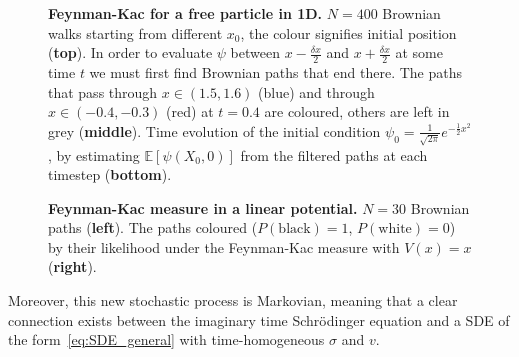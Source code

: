 \begin{figure}[H]
	\caption[Feynman-Kac for a free particle in 1D]{\textbf{Feynman-Kac for a free particle  in 1D.} $N=400$ Brownian walks starting from different $x_0$, the colour signifies initial position (\textbf{top}). In order to evaluate $\psi$ between $x-\frac{\delta x}{2}$ and $x+\frac{\delta x}{2}$ at some time $t$ we must first find Brownian paths that end there. The paths that pass through $x \in (1.5, 1.6)$ (blue) and through $x \in (-0.4,-0.3)$ (red) at $t=0.4$ are coloured, others are left in grey (\textbf{middle}). Time evolution of the initial condition $\psi_{0} = \frac{1}{\sqrt{2 \pi}} e^{-\frac{1}{2} x^{2}}$, by estimating ${\mathbb{E}}\left[\psi\left(X_{0}, 0\right)\right]$ from the filtered paths at each timestep (\textbf{bottom}).}
	\label{fig:fk_1d_example}
\end{figure}
\begin{figure}[t]
	\centering
	\caption[Feynman-Kac measure in a linear potential]{\textbf{Feynman-Kac measure in a linear potential.} 
		$N=30$ Brownian paths (\textbf{left}). The paths coloured ($P(\text{black})=1$, $P(\text{white})=0$) by their likelihood under the Feynman-Kac measure with $V(x)=x$ (\textbf{right}).}
	\label{fig:fkac_measure_reweight}
\end{figure}
Moreover, this new stochastic process is Markovian, meaning that a clear connection exists between the imaginary time Schr\" odinger equation and a SDE of the form~\eqref{eq:SDE_general} with time-homogeneous $\sigma$ and $v$.
